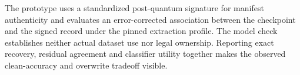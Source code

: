 The prototype uses a standardized post-quantum signature for manifest authenticity and evaluates an error-corrected association between the checkpoint and the signed record under the pinned extraction profile. The model check establishes neither actual dataset use nor legal ownership. Reporting exact recovery, residual agreement and classifier utility together makes the observed clean-accuracy and overwrite tradeoff visible.
